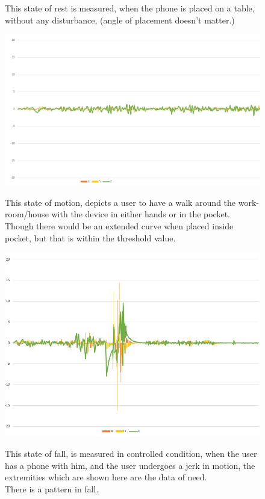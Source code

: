 {\begin{figure}[!htb]
This state of rest is measured, when the phone is placed on a table, without any disturbance, (angle of placement doesn't matter.) \par\medskip
    
{
	\centering
	\includegraphics[height=0.35\textheight]{fig01/g_walk}
	\label{fig:RHP02} \par\medskip
}


This state of motion, depicts a user to have a walk around the work-room/house with the device in either hands or in the pocket.\\
Though there would be an extended curve when placed inside pocket, but that is within the threshold value.
    
    
\end{figure}

\begin{figure}[h]


{
	\centering
	\includegraphics[height=0.35\textheight]{fig01/g_fall}
	\label{fig:RHP03} \par
    }
    
  This state of fall, is measured in controlled condition, when the user has a phone with him, and the user undergoes a jerk in motion, the extremities which are shown here are the data of need. \\
There is a pattern in fall.   
\end{figure}
}


